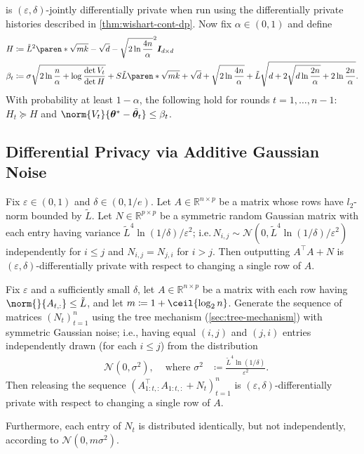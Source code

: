 \documentclass{article}
\renewcommand{\vec}[1]{\bm{#1}}
\newcommand{\defeq}{\coloneq}
\newcommand{\Real}{\mathds{R}}
\DeclarePairedDelimiter{\paren}()
\DeclarePairedDelimiter{\ceil}\lceil\rceil
\providecommand\transp{\top}
\let\transpsymbol\transp
\renewcommand{\transp}[1]{#1^\transpsymbol}
\newcommand{\Normal}{\mathcal{N}}
\newcommand{\Eye}[1]{\bm{I}_{#1 \times #1}}
\newcommand{\XtX}[1]{\transp{#1}{#1}}
\begin{document}
\begin{corollary}%
  \label{cor:wishart-alg}
   is $(\varepsilon,\delta)$-jointly differentially
  private when run using the differentially private histories
  described in \cref{thm:wishart-cont-dp}.  Now fix
  $\alpha\in(0,1)$ and define
  \begin{align*}
    H
    &\defeq \tilde L^2\paren*{\sqrt{mk} - \sqrt{d} - \sqrt{2\ln\frac{4n}{\alpha}}}^2\Eye{d} \\
    \beta_t
    &\defeq \sigma\sqrt{2\ln\frac{n}{\alpha} + \log\frac{\det V_t}{\det H}}
      + S \tilde L \paren*{\sqrt{mk} + \sqrt{d} + \sqrt{2\ln\frac{4n}{\alpha}}}
      + \tilde L \sqrt{d + 2\sqrt{d\ln\frac{2n}{\alpha}} + 2\ln\frac{2n}{\alpha}}.
  \end{align*}
  With probability at least $1-\alpha$, the following hold for rounds
  $t = 1,\dotsc,n-1$: $H_t \succeq H$ and
  $\norm{V_t}{\vec\theta^* - \tilde{\vec\theta}_t} \le
  \beta_t$.
\end{corollary}

\subsection{Differential Privacy via Additive Gaussian Noise}
\label{sec:dp-gauss}

\begin{theorem}%
  \label{thm:analyze-gauss}
  Fix $\varepsilon\in(0,1)$ and $\delta\in(0,1/e)$.  Let
  $A\in\Real^{n\times p}$ be a matrix whose rows have $l_2$-norm
  bounded by $\tilde L$.  Let $N\in\Real^{p\times p}$ be a symmetric
  random Gaussian matrix with each entry having variance
  $\tilde L^4\ln(1/\delta)/\varepsilon^2$;
  i.e.\,$N_{i,j}\sim\Normal(0,\tilde L^4\ln(1/\delta)/\varepsilon^2)$
  independently for $i \le j$ and $N_{i,j} = N_{j,i}$ for $i > j$.
  Then outputting $\XtX{A} + N$ is
  $(\varepsilon,\delta)$-differentially private with respect to
  changing a single row of $A$.
\end{theorem}

\begin{theorem}%
  \label{thm:analyze-gauss-cont}
  Fix $\varepsilon$ and a sufficiently small $\delta$, let
  $A\in\Real^{n\times p}$ be a matrix with each row having
  $\norm{}{A_{t,:}} \le \tilde L$, and let
  $m \defeq 1 + \ceil{\log_2n}$.  Generate the sequence of matrices
  $(N_t)_{t=1}^n$ using the tree mechanism (\cref{sec:tree-mechanism})
  with symmetric Gaussian noise; i.e., having equal $(i,j)$ and
  $(j,i)$ entries independently drawn (for each $i \le j$) from the
  distribution
  \begin{align*}
    &\Normal(0, \sigma^2),
    &\text{ where } \sigma^2
    &\defeq \frac{\tilde L^4 \ln(1/\delta)}{\varepsilon^2}.
  \end{align*}
  Then releasing the sequence $(\XtX{A_{1:t,:}} + N_t)_{t=1}^n$ is
  $(\varepsilon,\delta)$-differentially private with respect to
  changing a single row of $A$.

  Furthermore, each entry of $N_t$ is distributed identically, but not
  independently, according to $\Normal(0, m\sigma^2)$.
\end{theorem}
\end{document}
